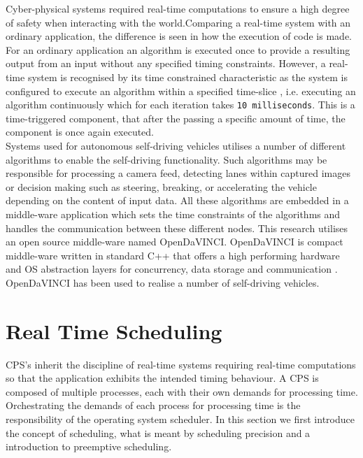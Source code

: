 Cyber-physical systems required real-time computations to ensure a high degree of safety when interacting with the world.Comparing a real-time system with an ordinary application, the difference is seen in how the execution of code is made. For an ordinary application an algorithm is executed once to provide a resulting output from an input without any specified timing constraints. However, a real-time system is recognised by its time constrained characteristic as the system is configured to execute an algorithm within a specified time-slice , i.e. executing an algorithm continuously which for each iteration takes \texttt{10 milliseconds}. This is a time-triggered component, that after the passing a specific amount of time, the component is once again executed. \\

Systems used for autonomous self-driving vehicles utilises a number of different algorithms to enable the self-driving functionality. Such algorithms may be responsible for processing a camera feed, detecting lanes within captured images or decision making such as steering, breaking, or accelerating the vehicle depending on the content of input data. All these algorithms are embedded in a middle-ware application which sets the time constraints of the algorithms and handles the communication between these different nodes. This research utilises an open source middle-ware named OpenDaVINCI. OpenDaVINCI is compact middle-ware written in standard C++ that offers a high performing hardware and OS abstraction layers for concurrency, data storage and communication \cite{OpenDaVINCI}. OpenDaVINCI has been used to realise a number of self-driving vehicles.


\section{Real Time Scheduling}


CPS's inherit the discipline of real-time systems requiring real-time computations so that the application exhibits the intended timing behaviour. A CPS is composed of multiple processes, each with their own demands for processing time. Orchestrating the demands of each process for processing time is the responsibility of the operating system scheduler. In this section we first introduce the concept of scheduling, what is meant by scheduling precision and a introduction to preemptive scheduling. 

